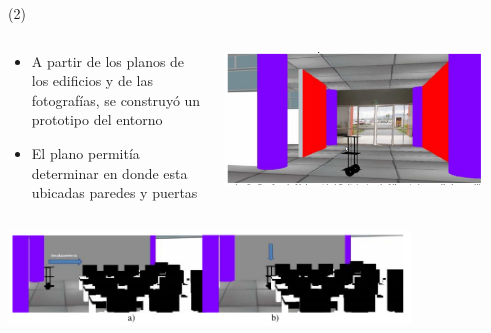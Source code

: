 \begin{frame}{ (2)}
\begin{columns}
\begin{column}{0.60\textwidth}
    \begin{center}

\begin{itemize}
\item A partir de los planos de los edificios y de las fotografías, se construyó un prototipo del entorno
\item El plano permitía determinar en donde esta ubicadas paredes y puertas
\end{itemize}
     \end{center}

\end{column}
\begin{column}{0.38\textwidth}  
    \begin{center}
\begin{itemize}
\end{itemize}
     \includegraphics[width=0.9\textwidth]{Figs/SerbotI_B}\\
     \end{center}
\end{column}
\end{columns}
\includegraphics[width=0.8\textwidth]{Figs/SerbotI_C}\\


\end{frame}


